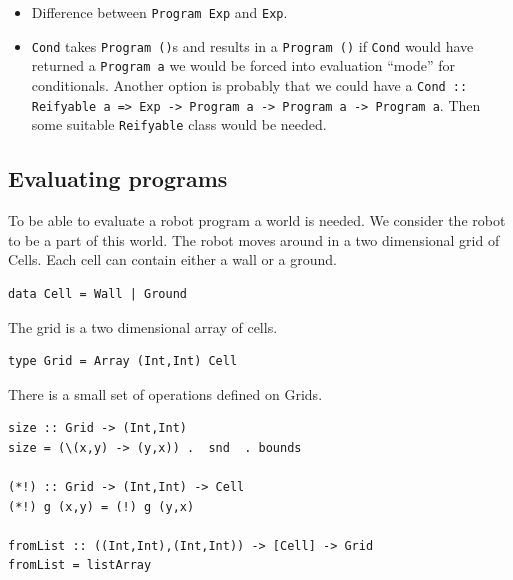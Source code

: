 \begin{itemize}
 \item Difference between {\tt Program Exp} and {\tt Exp}.
 \item {\tt Cond} takes {\tt Program ()}s and results in a {\tt Program ()} 
   if {\tt Cond} would have returned a {\tt Program a} we would be forced into 
   evaluation ``mode'' for conditionals. \newline 
   Another option is probably that we could have a 
   {\tt Cond :: Reifyable a => Exp -> Program a -> Program a -> Program a}. 
   Then some suitable {\tt Reifyable} class would be needed. 
\end{itemize} 




\subsection{Evaluating programs} 

To be able to evaluate a robot program a world is needed. We consider the 
robot to be a part of this world. The robot moves around in a two dimensional 
grid of Cells. Each cell can contain either a wall or a ground.  

\begin{small}
\begin{verbatim}
data Cell = Wall | Ground 
\end{verbatim}
\end{small}

The grid is a two dimensional array of cells. 

\begin{small}
\begin{verbatim}
type Grid = Array (Int,Int) Cell
\end{verbatim}
\end{small}

There is a small set of operations defined on Grids. 

\begin{small}
\begin{verbatim}
size :: Grid -> (Int,Int) 
size = (\(x,y) -> (y,x)) .  snd  . bounds 

(*!) :: Grid -> (Int,Int) -> Cell
(*!) g (x,y) = (!) g (y,x)

fromList :: ((Int,Int),(Int,Int)) -> [Cell] -> Grid 
fromList = listArray
\end{verbatim}
\end{small}

